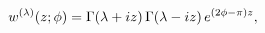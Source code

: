 \[w^{(\lambda)}(z;\phi)=\mathop{\Gamma\/}\nolimits\!\left(\lambda+iz\right)%
\mathop{\Gamma\/}\nolimits\!\left(\lambda-iz\right)e^{(2\phi-\pi)z},\]